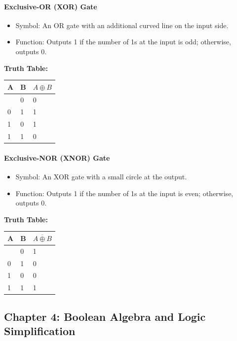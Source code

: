 \documentclass[
  a4paper,
]{article}
\providecommand{\tightlist}{%
  \setlength{\itemsep}{0pt}\setlength{\parskip}{0pt}}
\begin{document}
\paragraph{Exclusive-OR (XOR) Gate}\label{exclusive-or-xor-gate}

\begin{itemize}
\tightlist
\item
  Symbol: An OR gate with an additional curved line on the input side.
\item
  Function: Outputs 1 if the number of 1s at the input is odd;
  otherwise, outputs 0.
\end{itemize}

\textbf{Truth Table:}

\begin{longtable}[]{@{}lll@{}}
\toprule\noalign{}
A & B & \(A \oplus B\) \\
\midrule\noalign{}
\endhead
\bottomrule\noalign{}
\endlastfoot
0 & 0 & 0 \\
0 & 1 & 1 \\
1 & 0 & 1 \\
1 & 1 & 0 \\
\end{longtable}

\paragraph{Exclusive-NOR (XNOR) Gate}\label{exclusive-nor-xnor-gate}

\begin{itemize}
\tightlist
\item
  Symbol: An XOR gate with a small circle at the output.
\item
  Function: Outputs 1 if the number of 1s at the input is even;
  otherwise, outputs 0.
\end{itemize}

\textbf{Truth Table:}

\begin{longtable}[]{@{}lll@{}}
\toprule\noalign{}
A & B & \(\overline{A \oplus B}\) \\
\midrule\noalign{}
\endhead
\bottomrule\noalign{}
\endlastfoot
0 & 0 & 1 \\
0 & 1 & 0 \\
1 & 0 & 0 \\
1 & 1 & 1 \\
\end{longtable}

\subsection{Chapter 4: Boolean Algebra and Logic
Simplification}\label{chapter-4-boolean-algebra-and-logic-simplification}
\end{document}

